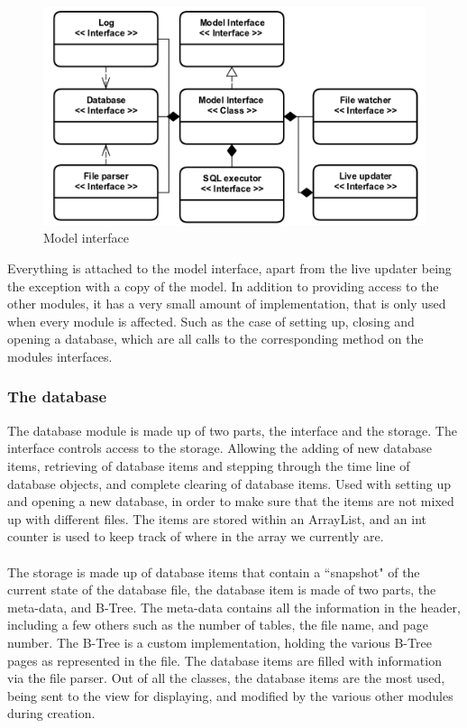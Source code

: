 \begin{figure}[H]
	\centering
	\includegraphics[scale=0.3]{images/model_interface_design.png}
	\caption{Model interface}
	\label{fig:model_interface_design}
\end{figure}

Everything is attached to the model interface, apart from the live updater being the exception with a copy of the model. In addition to providing access to the other modules, it has a very small amount of implementation, that is only used when every module is affected. Such as the case of setting up, closing and opening a database, which are all calls to the corresponding method on the modules interfaces. 

\subsubsection{The database}
\label{subsubsec:databse_imp}

The database module is made up of two parts, the interface and the storage. The interface controls access to the storage. Allowing the adding of new database items, retrieving of database items and stepping through the time line of database objects, and complete clearing of database items. Used with setting up and opening a new database, in order to make sure that the items are not mixed up with different files. The items are stored within an ArrayList, and an int counter is used to keep track of where in the array we currently are.
\\\\
The storage is made up of database items that contain a ``snapshot" of the current state of the database file, the database item is made of two parts, the meta-data, and B-Tree. The meta-data contains all the information in the header, including a few others such as the number of tables, the file name, and page number. The B-Tree is a custom implementation, holding the various B-Tree pages as represented in the file. The database items are filled with information via the file parser. Out of all the classes, the database items are the most used, being sent to the view for displaying, and modified by the various other modules during creation. 

